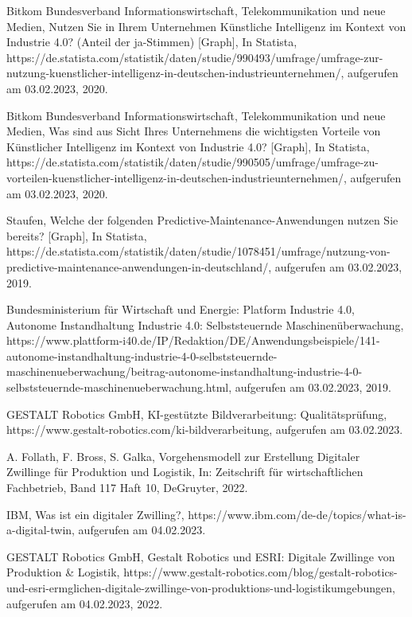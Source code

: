 \begin{thebibliography}{99}
	Bitkom Bundesverband Informationswirtschaft, Telekommunikation und neue Medien,
	Nutzen Sie in Ihrem Unternehmen Künstliche Intelligenz im Kontext von Industrie 4.0? (Anteil der ja-Stimmen) [Graph],
	In Statista,
	https://de.statista.com/statistik/daten/studie/990493/umfrage/umfrage-zur-nutzung-kuenstlicher-intelligenz-in-deutschen-industrieunternehmen/,
	aufgerufen am 03.02.2023,
	2020.

	Bitkom Bundesverband Informationswirtschaft, Telekommunikation und neue Medien,
	Was sind aus Sicht Ihres Unternehmens die wichtigsten Vorteile von Künstlicher Intelligenz im Kontext von Industrie 4.0? [Graph],
	In Statista,
	https://de.statista.com/statistik/daten/studie/990505/umfrage/umfrage-zu-vorteilen-kuenstlicher-intelligenz-in-deutschen-industrieunternehmen/,
	aufgerufen am 03.02.2023,
	2020.

	Staufen,
	Welche der folgenden Predictive-Maintenance-Anwendungen nutzen Sie bereits? [Graph],
	In Statista,
	https://de.statista.com/statistik/daten/studie/1078451/umfrage/nutzung-von-predictive-maintenance-anwendungen-in-deutschland/,
	aufgerufen am 03.02.2023,
	2019.

	Bundesministerium für Wirtschaft und Energie: Platform Industrie 4.0,
	Autonome Instandhaltung Industrie 4.0: Selbststeuernde Maschinenüberwachung,
	https://www.plattform-i40.de/IP/Redaktion/DE/Anwendungsbeispiele/141-autonome-instandhaltung-industrie-4-0-selbststeuernde-maschinenueberwachung/beitrag-autonome-instandhaltung-industrie-4-0-selbststeuernde-maschinenueberwachung.html,
	aufgerufen am 03.02.2023,
	2019.

	GESTALT Robotics GmbH,
	KI-gestützte Bildverarbeitung: Qualitätsprüfung, 
	https://www.gestalt-robotics.com/ki-bildverarbeitung, 
	aufgerufen am 03.02.2023.

	A. Follath, F. Bross, S. Galka,	
	Vorgehensmodell zur Erstellung Digitaler Zwillinge für Produktion und Logistik,
	In: Zeitschrift für wirtschaftlichen Fachbetrieb, Band 117 Haft 10,
	DeGruyter,
	2022.

	IBM,
	Was ist ein digitaler Zwilling?,
	https://www.ibm.com/de-de/topics/what-is-a-digital-twin,
	aufgerufen am 04.02.2023.

	GESTALT Robotics GmbH,
	Gestalt Robotics und ESRI: Digitale Zwillinge von Produktion \& Logistik, 
	https://www.gestalt-robotics.com/blog/gestalt-robotics-und-esri-ermglichen-digitale-zwillinge-von-produktions-und-logistikumgebungen,
	aufgerufen am 04.02.2023,
	2022.


\end{thebibliography}

